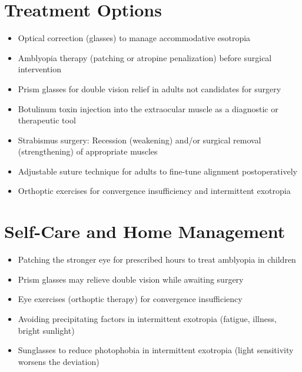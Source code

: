 \section*{Treatment Options}
\begin{itemize}
  \item Optical correction (glasses) to manage accommodative esotropia
  \item Amblyopia therapy (patching or atropine penalization) before surgical intervention
  \item Prism glasses for double vision relief in adults not candidates for surgery
  \item Botulinum toxin injection into the extraocular muscle as a diagnostic or therapeutic tool
  \item Strabismus surgery: Recession (weakening) and/or surgical removal (strengthening) of appropriate muscles
  \item Adjustable suture technique for adults to fine-tune alignment postoperatively
  \item Orthoptic exercises for convergence insufficiency and intermittent exotropia
\end{itemize}

\section*{Self-Care and Home Management}
\begin{itemize}
  \item Patching the stronger eye for prescribed hours to treat amblyopia in children
  \item Prism glasses may relieve double vision while awaiting surgery
  \item Eye exercises (orthoptic therapy) for convergence insufficiency
  \item Avoiding precipitating factors in intermittent exotropia (fatigue, illness, bright sunlight)
  \item Sunglasses to reduce photophobia in intermittent exotropia (light sensitivity worsens the deviation)
\end{itemize}

